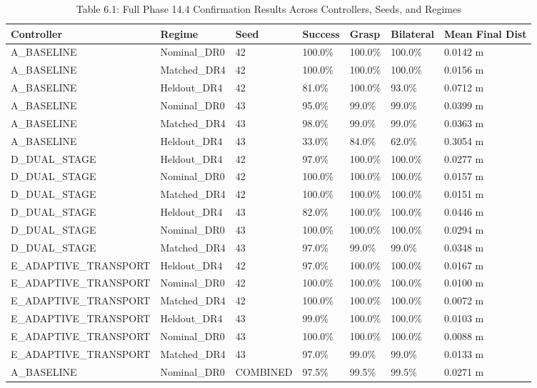 \documentclass[11pt,a4paper,oneside]{book}
\begin{document}
\begin{longtable}{l l l l l l l}\caption{Table 6.1: Full Phase 14.4 Confirmation Results Across Controllers, Seeds, and Regimes}\\\toprule
Controller & Regime & Seed & Success & Grasp & Bilateral & Mean Final Dist \\ \midrule \endhead
A\_BASELINE & Nominal\_DR0 & 42 & 100.0\% & 100.0\% & 100.0\% & 0.0142 m \\
A\_BASELINE & Matched\_DR4 & 42 & 100.0\% & 100.0\% & 100.0\% & 0.0156 m \\
A\_BASELINE & Heldout\_DR4 & 42 & 81.0\% & 100.0\% & 93.0\% & 0.0712 m \\
A\_BASELINE & Nominal\_DR0 & 43 & 95.0\% & 99.0\% & 99.0\% & 0.0399 m \\
A\_BASELINE & Matched\_DR4 & 43 & 98.0\% & 99.0\% & 99.0\% & 0.0363 m \\
A\_BASELINE & Heldout\_DR4 & 43 & 33.0\% & 84.0\% & 62.0\% & 0.3054 m \\
D\_DUAL\_STAGE & Heldout\_DR4 & 42 & 97.0\% & 100.0\% & 100.0\% & 0.0277 m \\
D\_DUAL\_STAGE & Nominal\_DR0 & 42 & 100.0\% & 100.0\% & 100.0\% & 0.0157 m \\
D\_DUAL\_STAGE & Matched\_DR4 & 42 & 100.0\% & 100.0\% & 100.0\% & 0.0151 m \\
D\_DUAL\_STAGE & Heldout\_DR4 & 43 & 82.0\% & 100.0\% & 100.0\% & 0.0446 m \\
D\_DUAL\_STAGE & Nominal\_DR0 & 43 & 100.0\% & 100.0\% & 100.0\% & 0.0294 m \\
D\_DUAL\_STAGE & Matched\_DR4 & 43 & 97.0\% & 99.0\% & 99.0\% & 0.0348 m \\
E\_ADAPTIVE\_TRANSPORT & Heldout\_DR4 & 42 & 97.0\% & 100.0\% & 100.0\% & 0.0167 m \\
E\_ADAPTIVE\_TRANSPORT & Nominal\_DR0 & 42 & 100.0\% & 100.0\% & 100.0\% & 0.0100 m \\
E\_ADAPTIVE\_TRANSPORT & Matched\_DR4 & 42 & 100.0\% & 100.0\% & 100.0\% & 0.0072 m \\
E\_ADAPTIVE\_TRANSPORT & Heldout\_DR4 & 43 & 99.0\% & 100.0\% & 100.0\% & 0.0103 m \\
E\_ADAPTIVE\_TRANSPORT & Nominal\_DR0 & 43 & 100.0\% & 100.0\% & 100.0\% & 0.0088 m \\
E\_ADAPTIVE\_TRANSPORT & Matched\_DR4 & 43 & 97.0\% & 99.0\% & 99.0\% & 0.0133 m \\
A\_BASELINE & Nominal\_DR0 & COMBINED & 97.5\% & 99.5\% & 99.5\% & 0.0271 m \\

\end{longtable}
\end{document}
